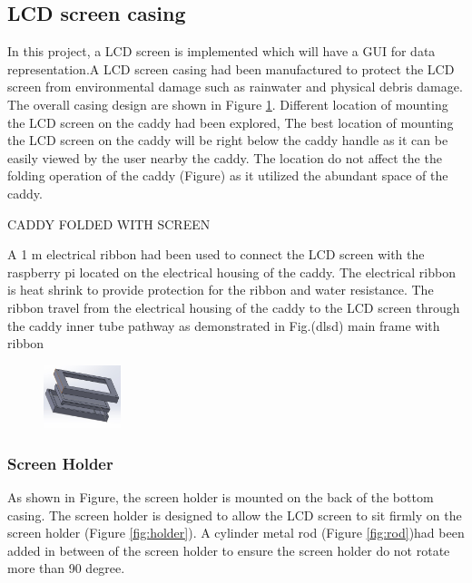 \documentclass[11pt,landscape]{article}
\begin{document}
\newpage

\begin{multicols}{3}
    \subsection{LCD screen casing}
    In this project, a LCD screen is implemented which will have a GUI for data
    representation.A LCD screen casing had been manufactured to protect the LCD
    screen from environmental damage such as rainwater and physical debris
    damage. The overall casing design are shown in Figure \ref{fig:casing}.
    Different location of mounting the LCD screen on the caddy had been
    explored, The best location of mounting the LCD screen on the caddy will be
    right below the caddy handle as it can be easily viewed by the user nearby
    the caddy. The location do not affect the the folding operation of the caddy
    (Figure) as it utilized the abundant space of the caddy. 
    
    CADDY FOLDED WITH SCREEN
    
    A 1 m electrical ribbon had been used to connect the LCD screen with the
    raspberry pi located on the electrical housing of the caddy. The electrical
    ribbon is heat shrink to provide protection for the ribbon and water
    resistance. The ribbon travel from the electrical housing of the caddy to
    the LCD screen through the caddy inner tube pathway as demonstrated in
    Fig.(dlsd) main frame with ribbon

    \begin{figure}[H]
        \begin{center}
            \includegraphics[width=0.2\textwidth]{Figure10.jpg}
            \label{fig:casing}
        \end{center}
    \end{figure}
    
    \subsubsection{Screen Holder}
    As shown in Figure, the screen holder is mounted on the back of the bottom
    casing. The screen holder is designed to allow the LCD screen to sit firmly
    on the screen holder (Figure \ref{fig:holder}). A cylinder metal rod (Figure
    \ref{fig:rod})had been added in between of the screen holder to ensure the
    screen holder do not rotate more than 90 degree.
    

\end{multicols}
\end{document}
